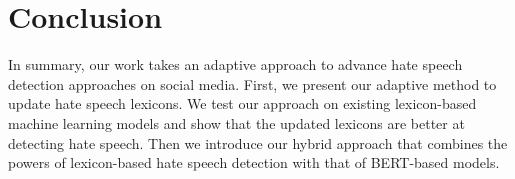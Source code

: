 \section{Conclusion}
In summary, our work takes an adaptive approach to advance hate speech detection approaches on social media.
First, we present our adaptive method to update hate speech lexicons.
We test our approach on existing lexicon-based machine learning models and show that the updated lexicons are better at detecting hate speech.
Then we introduce our hybrid approach that combines the powers of lexicon-based hate speech detection with that of BERT-based models.